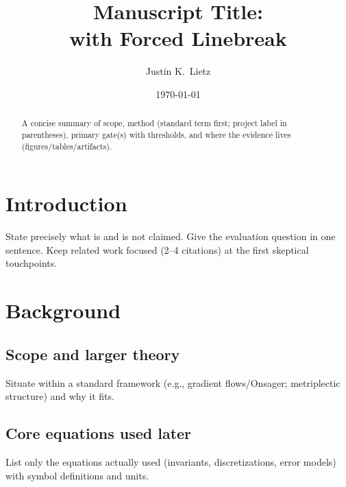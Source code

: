 \documentclass[%
 reprint,                %
 superscriptaddress,     %
 aps,                    %
 prx,                    %
]{revtex4-2}
\begin{document}

\title{Manuscript Title:\\ with Forced Linebreak} %
\author{Justin K.\ Lietz}

\date{\today}

\begin{abstract}
A concise summary of scope, method (standard term first; project label in parentheses),
primary gate(s) with thresholds, and where the evidence lives (figures/tables/artifacts).
\end{abstract}

\maketitle

\section{Introduction}
State precisely what is and is not claimed. Give the evaluation question in one sentence.
Keep related work focused (2–4 citations) at the first skeptical touchpoints.

\section{Background}
\subsection{Scope and larger theory}
Situate within a standard framework (e.g., gradient flows/Onsager; metriplectic structure) and why it fits.

\subsection{Core equations used later}
List only the equations actually used (invariants, discretizations, error models) with symbol definitions and units.
\end{document}
